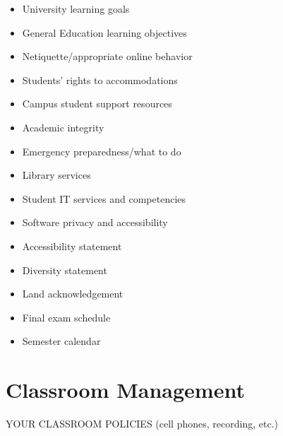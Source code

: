 \documentclass[12pt]{article}     %
\begin{document}
\begin{itemize}
\item University learning goals
\item General Education learning objectives
\item Netiquette/appropriate online behavior
\item Students' rights to accommodations
\item Campus student support resources
\item Academic integrity
\item Emergency preparedness/what to do
\item Library services
\item Student IT services and competencies
\item Software privacy and accessibility
\item Accessibility statement
\item Diversity statement
\item Land acknowledgement
\item Final exam schedule
\item Semester calendar
\end{itemize}

\section*{Classroom Management}
YOUR CLASSROOM POLICIES (cell phones, recording, etc.)

% 
% 
% 
\end{document}
